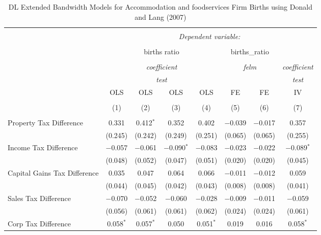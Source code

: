 
\begin{table}[!htbp] \centering 
  \caption{DL Extended Bandwidth Models for  Accommodation and foodservices Firm Births using Donald and Lang (2007)} 
  \label{} 
\begin{tabular}{@{\extracolsep{5pt}}lccccccc} 
\\[-1.8ex]\hline 
\hline \\[-1.8ex] 
 & \multicolumn{7}{c}{\textit{Dependent variable:}} \\ 
\cline{2-8} 
\\[-1.8ex] & \multicolumn{4}{c}{births ratio} & \multicolumn{2}{c}{births\_ratio} &   \\ 
\\[-1.8ex] & \multicolumn{4}{c}{\textit{coefficient}} & \multicolumn{2}{c}{\textit{felm}} & \textit{coefficient} \\ 
 & \multicolumn{4}{c}{\textit{test}} & \multicolumn{2}{c}{\textit{}} & \textit{test} \\ 
 & OLS & OLS & OLS & OLS & FE & FE & IV \\ 
\\[-1.8ex] & (1) & (2) & (3) & (4) & (5) & (6) & (7)\\ 
\hline \\[-1.8ex] 
 Property Tax Difference & 0.331 & 0.412$^{*}$ & 0.352 & 0.402 & $-$0.039 & $-$0.017 & 0.357 \\ 
  & (0.245) & (0.242) & (0.249) & (0.251) & (0.065) & (0.065) & (0.255) \\ 
  Income Tax Difference & $-$0.057 & $-$0.061 & $-$0.090$^{*}$ & $-$0.083 & $-$0.023 & $-$0.022 & $-$0.089$^{*}$ \\ 
  & (0.048) & (0.052) & (0.047) & (0.051) & (0.020) & (0.020) & (0.045) \\ 
  Capital Gains Tax Difference & 0.035 & 0.047 & 0.064 & 0.066 & $-$0.011 & $-$0.012 & 0.059 \\ 
  & (0.044) & (0.045) & (0.042) & (0.043) & (0.008) & (0.008) & (0.041) \\ 
  Sales Tax Difference & $-$0.070 & $-$0.052 & $-$0.060 & $-$0.028 & $-$0.009 & $-$0.011 & $-$0.059 \\ 
  & (0.056) & (0.061) & (0.061) & (0.062) & (0.024) & (0.024) & (0.061) \\ 
  Corp Tax Difference & 0.058$^{*}$ & 0.057$^{*}$ & 0.050 & 0.051$^{*}$ & 0.019 & 0.016 & 0.058$^{*}$ \\ 

\end{tabular}
\end{table}
